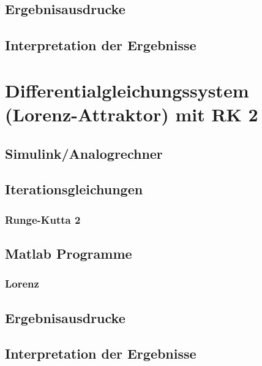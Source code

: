 \documentclass[10pt]{scrartcl}
\begin{document}
	\subsection{Ergebnisausdrucke}	
		
	\subsection{Interpretation der Ergebnisse}	
	
\section{Differentialgleichungssystem (Lorenz-Attraktor) mit RK 2}	
	\subsection{Simulink/Analogrechner}
	
	\subsection{Iterationsgleichungen}
		\subsubsection{Runge-Kutta 2}

	\subsection{Matlab Programme}
		\subsubsection{Lorenz}			

	\subsection{Ergebnisausdrucke}	
		
	\subsection{Interpretation der Ergebnisse}				
\end{document}

